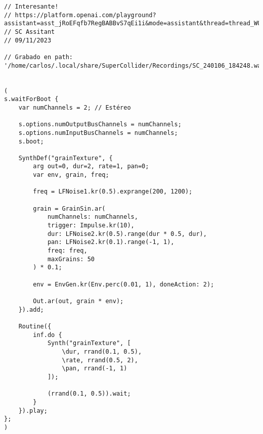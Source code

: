 \begin{minipage}[t]{1\textwidth}
    \centering
    \begin{lstlisting}[style=SuperCollider-IDE, basicstyle=\footnotesize\ttfamily, numbers=none]
// Interesante!
// https://platform.openai.com/playground?assistant=asst_jRoEFqfb7RegBABBvS7qEi1i&mode=assistant&thread=thread_W0hsopVAd3SiA1yT4zzNbB97
// SC Assitant
// 09/11/2023

// Grabado en path: '/home/carlos/.local/share/SuperCollider/Recordings/SC_240106_184248.wav'


(
s.waitForBoot {
    var numChannels = 2; // Estéreo

    s.options.numOutputBusChannels = numChannels;
    s.options.numInputBusChannels = numChannels;
    s.boot;

    SynthDef("grainTexture", {
        arg out=0, dur=2, rate=1, pan=0;
        var env, grain, freq;

        freq = LFNoise1.kr(0.5).exprange(200, 1200);

        grain = GrainSin.ar(
            numChannels: numChannels,
            trigger: Impulse.kr(10),
            dur: LFNoise2.kr(0.5).range(dur * 0.5, dur),
            pan: LFNoise2.kr(0.1).range(-1, 1),
            freq: freq,
            maxGrains: 50
        ) * 0.1;

        env = EnvGen.kr(Env.perc(0.01, 1), doneAction: 2);

        Out.ar(out, grain * env);
    }).add;

    Routine({
        inf.do {
            Synth("grainTexture", [
                \dur, rrand(0.1, 0.5),
                \rate, rrand(0.5, 2),
                \pan, rrand(-1, 1)
            ]);

            (rrand(0.1, 0.5)).wait;
        }
    }).play;
};
)                                      
    \end{lstlisting}
    \vspace{1cm}
\end{minipage}














